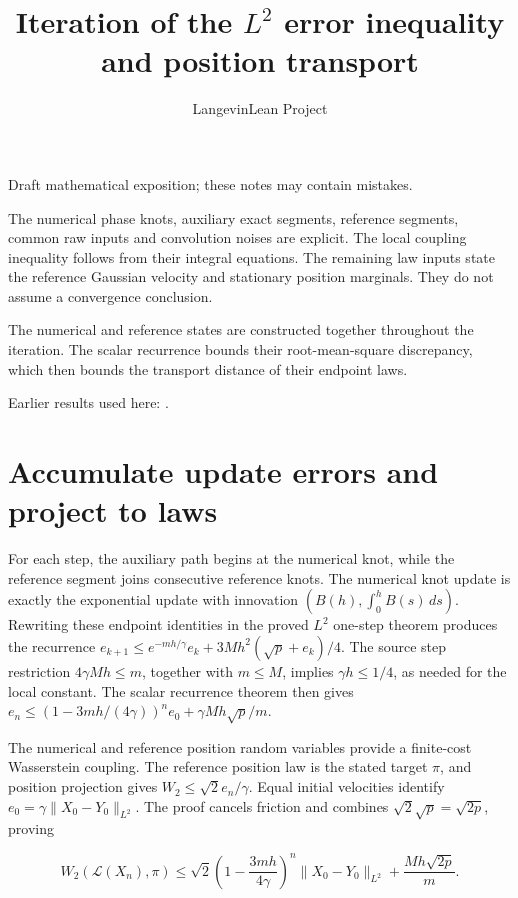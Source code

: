 \documentclass[11pt,a4paper]{article}
\title{\texorpdfstring{Iteration of the \(L^{2}\) error inequality and position transport}{Iteration of the L² error inequality and position transport}}
\author{LangevinLean Project}
\date{}
\begin{document}
\maketitle
Draft mathematical exposition; these notes may contain mistakes.


The numerical phase knots, auxiliary exact segments, reference segments, common raw inputs and convolution noises are explicit. The local coupling inequality follows from their integral equations. The remaining law inputs state the reference Gaussian velocity and stationary position marginals. They do not assume a convergence conclusion.



The numerical and reference states are constructed together throughout the iteration. The scalar recurrence bounds their root-mean-square discrepancy, which then bounds the transport distance of their endpoint laws.



Earlier results used here: \cite[Section~3.17]{LangevinLean2026ULASC}.

\section{\texorpdfstring{Accumulate update errors and project to laws}{Accumulate update errors and project to laws}}


For each step, the auxiliary path begins at the numerical knot, while the reference segment joins consecutive reference knots. The numerical knot update is exactly the exponential update with innovation \((B(h),\int_0^hB(s)\,ds)\). Rewriting these endpoint identities in the proved \(L^{2}\) one-step theorem produces the recurrence \(e_{k+1}\le e^{-mh/\gamma}e_k+3Mh^2(\sqrt p+e_k)/4\). The source step restriction \(4\gamma Mh\le m\), together with \(m\le M\), implies \(\gamma h\le1/4\), as needed for the local constant. The scalar recurrence theorem then gives \(e_n\le(1-3mh/(4\gamma))^ne_0+\gamma Mh\sqrt p/m\).



The numerical and reference position random variables provide a finite-cost Wasserstein coupling. The reference position law is the stated target \(\pi\), and position projection gives \(W_2\le\sqrt2e_n/\gamma\). Equal initial velocities identify \(e_0=\gamma\|X_0-Y_0\|_{L^2}\). The proof cancels friction and combines \(\sqrt2\sqrt p=\sqrt{2p}\), proving

\[W_2(\mathcal L(X_n),\pi)\le\sqrt2\left(1-\frac{3mh}{4\gamma}\right)^n\|X_0-Y_0\|_{L^2}+\frac{Mh\sqrt{2p}}m.\]
\end{document}

